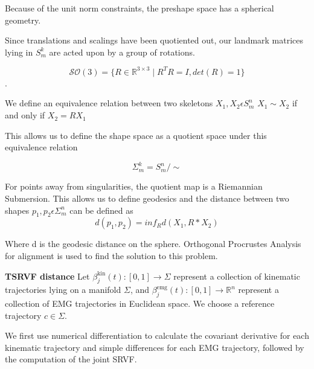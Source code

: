 \documentclass{article}
\begin{document}
Because of the unit norm constraints, the preshape space has a spherical geometry.


Since translations and scalings have been quotiented out, our landmark matrices lying in $S_m^k$ are acted upon by a group of rotations.

\begin{equation}
    \mathcal{SO}(3) = \{ R \in \mathbb{R}^{3 \times 3} \mid R^T R = I, det(R) = 1 \}
\end{equation}.  

We define an equivalence relation between two skeletons $X_1, X_2 \epsilon S_m^n$ \( X_1 \sim X_2 \) if and only if \( X_2 = R X_1 \)

This allows us to define the shape space as a quotient space under this equivalence relation

\begin{equation}
    \Sigma_m^k = S_m^n / \sim
\end{equation}

For points away from singularities, the quotient map is a Riemannian Submersion. This allows us to define geodesics and the distance between two shapes $p_1, p_2 \epsilon \Sigma_m^n$ can be defined as
\begin{equation}
    d(p_1,p_2) = inf_{R} d(X_1, R * X_2)
\end{equation}

Where d is the geodesic distance on the sphere. Orthogonal Procrustes Analysis for alignment is used to find the solution to this problem.

\textbf{TSRVF distance}
Let $\beta_j^{\text{kin}}(t): [0, 1] \rightarrow \Sigma$ represent a collection of kinematic trajectories lying on a manifold $\Sigma$, and $\beta_j^{\text{emg}}(t): [0, 1] \rightarrow \mathbb{R}^n$ represent a collection of EMG trajectories in Euclidean space. We choose a reference trajectory $c \in \Sigma$.

We first use numerical differentiation to calculate the covariant derivative for each kinematic trajectory and simple differences for each EMG trajectory, followed by the computation of the joint SRVF.
\end{document}
